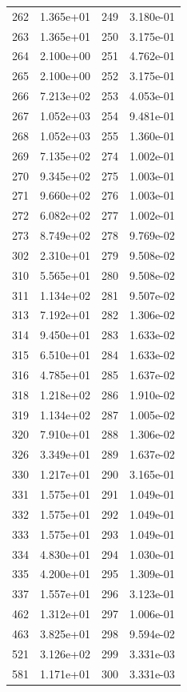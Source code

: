 \documentclass[12pt]{article}
\begin{document}
\begin{longtable}{@{}cccc@{}}
262 & 1.365e+01 & 249 & 3.180e-01 \\
263 & 1.365e+01 & 250 & 3.175e-01 \\
264 & 2.100e+00 & 251 & 4.762e-01 \\
265 & 2.100e+00 & 252 & 3.175e-01 \\
266 & 7.213e+02 & 253 & 4.053e-01 \\
267 & 1.052e+03 & 254 & 9.481e-01 \\
268 & 1.052e+03 & 255 & 1.360e-01 \\
269 & 7.135e+02 & 274 & 1.002e-01 \\
270 & 9.345e+02 & 275 & 1.003e-01 \\
271 & 9.660e+02 & 276 & 1.003e-01 \\
272 & 6.082e+02 & 277 & 1.002e-01 \\
273 & 8.749e+02 & 278 & 9.769e-02 \\
302 & 2.310e+01 & 279 & 9.508e-02 \\
310 & 5.565e+01 & 280 & 9.508e-02 \\
311 & 1.134e+02 & 281 & 9.507e-02 \\
313 & 7.192e+01 & 282 & 1.306e-02 \\
314 & 9.450e+01 & 283 & 1.633e-02 \\
315 & 6.510e+01 & 284 & 1.633e-02 \\
316 & 4.785e+01 & 285 & 1.637e-02 \\
318 & 1.218e+02 & 286 & 1.910e-02 \\
319 & 1.134e+02 & 287 & 1.005e-02 \\
320 & 7.910e+01 & 288 & 1.306e-02 \\
326 & 3.349e+01 & 289 & 1.637e-02 \\
330 & 1.217e+01 & 290 & 3.165e-01 \\
331 & 1.575e+01 & 291 & 1.049e-01 \\
332 & 1.575e+01 & 292 & 1.049e-01 \\
333 & 1.575e+01 & 293 & 1.049e-01 \\
334 & 4.830e+01 & 294 & 1.030e-01 \\
335 & 4.200e+01 & 295 & 1.309e-01 \\
337 & 1.557e+01 & 296 & 3.123e-01 \\
462 & 1.312e+01 & 297 & 1.006e-01 \\
463 & 3.825e+01 & 298 & 9.594e-02 \\
521 & 3.126e+02 & 299 & 3.331e-03 \\
581 & 1.171e+01 & 300 & 3.331e-03 \\

\end{longtable}
\end{document}
